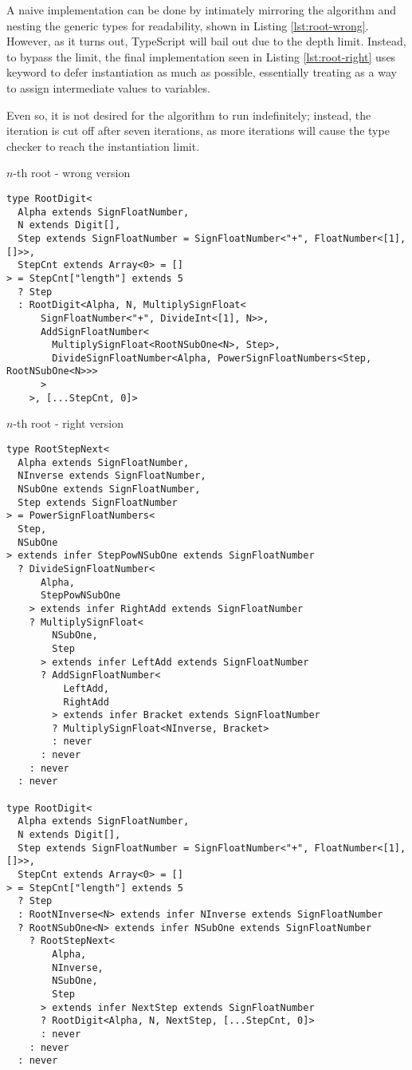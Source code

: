 A naive implementation can be done by intimately mirroring the algorithm and nesting the generic types for readability, shown in Listing \ref{lst:root-wrong}. However, as it turns out, TypeScript will bail out due to the depth limit. Instead, to bypass the limit, the final implementation seen in Listing \ref{lst:root-right} uses  keyword to defer instantiation as much as possible, essentially treating  as a way to assign intermediate values to variables.

Even so, it is not desired for the algorithm to run indefinitely; instead, the iteration is cut off after seven iterations, as more iterations will cause the type checker to reach the instantiation limit.


\begin{listing}[ht]
  \caption{$n$-th root - wrong version}\label{lst:root-wrong}
  \begin{verbatim}
type RootDigit<
  Alpha extends SignFloatNumber,
  N extends Digit[],
  Step extends SignFloatNumber = SignFloatNumber<"+", FloatNumber<[1], []>>,
  StepCnt extends Array<0> = []
> = StepCnt["length"] extends 5
  ? Step
  : RootDigit<Alpha, N, MultiplySignFloat<
      SignFloatNumber<"+", DivideInt<[1], N>>,
      AddSignFloatNumber<
        MultiplySignFloat<RootNSubOne<N>, Step>,
        DivideSignFloatNumber<Alpha, PowerSignFloatNumbers<Step, RootNSubOne<N>>>
      >
    >, [...StepCnt, 0]>
\end{verbatim}
\end{listing}

\begin{listing}[ht]
  \caption{$n$-th root - right version}\label{lst:root-right}
  \begin{verbatim}
type RootStepNext<
  Alpha extends SignFloatNumber,
  NInverse extends SignFloatNumber,
  NSubOne extends SignFloatNumber,
  Step extends SignFloatNumber
> = PowerSignFloatNumbers<
  Step,
  NSubOne
> extends infer StepPowNSubOne extends SignFloatNumber
  ? DivideSignFloatNumber<
      Alpha,
      StepPowNSubOne
    > extends infer RightAdd extends SignFloatNumber
    ? MultiplySignFloat<
        NSubOne,
        Step
      > extends infer LeftAdd extends SignFloatNumber
      ? AddSignFloatNumber<
          LeftAdd,
          RightAdd
        > extends infer Bracket extends SignFloatNumber
        ? MultiplySignFloat<NInverse, Bracket>
        : never
      : never
    : never
  : never

type RootDigit<
  Alpha extends SignFloatNumber,
  N extends Digit[],
  Step extends SignFloatNumber = SignFloatNumber<"+", FloatNumber<[1], []>>,
  StepCnt extends Array<0> = []
> = StepCnt["length"] extends 5
  ? Step
  : RootNInverse<N> extends infer NInverse extends SignFloatNumber
  ? RootNSubOne<N> extends infer NSubOne extends SignFloatNumber
    ? RootStepNext<
        Alpha,
        NInverse,
        NSubOne,
        Step
      > extends infer NextStep extends SignFloatNumber
      ? RootDigit<Alpha, N, NextStep, [...StepCnt, 0]>
      : never
    : never
  : never
\end{verbatim}
\end{listing}